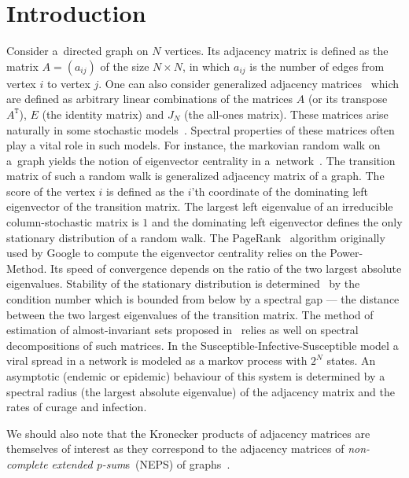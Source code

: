 \documentclass[a4paper]{jpconf}
\begin{document}
\section{Introduction}
Consider a~directed graph on \( N \) vertices.
Its adjacency matrix is defined as
    the matrix
    \( A = (a_{ij}) \)
    of the size \( N\times N \),
    in which \( a_{ij} \)
    is the number of edges
    from vertex \( i \)
    to vertex \( j \).
One can also consider generalized
    adjacency matrices~\cite{van2003graphs}
    which are defined as
    arbitrary linear combinations
    of the matrices \( A \) (or its transpose \( A^\mathtt{T} \)),
    \( E \) (the identity matrix)
    and \( J_N \) (the all-ones matrix).
These matrices arise naturally
    in some stochastic models~\cite[p.~184]{cvetkovic2010introduction}.
Spectral  properties of these matrices
    often play a vital role in such models.
For instance, the markovian random walk on a~graph
    yields the notion of eigenvector centrality
    in a~network~\cite{bonacich1972factoring}.
The transition matrix of such a random walk
    is generalized adjacency matrix of a graph.
The score of the vertex \( i \)
    is defined as the \( i \)'th coordinate
    of the dominating left eigenvector
    of the transition matrix.
The largest left eigenvalue of an irreducible column-stochastic matrix
    is \( 1 \) and the dominating left eigenvector
    defines the only stationary distribution
    of a random walk.
The PageRank~\cite{ilprints422} algorithm
    originally used by Google
    to compute the eigenvector centrality
    relies on the Power-Method.
Its speed of convergence depends on
    the ratio of the two largest absolute eigenvalues.
Stability of the stationary distribution
    is determined~\cite{meyer1994sensitivity}
    by the condition number
    which is bounded from below
    by a spectral gap --- the distance between
    the two largest eigenvalues
    of the transition matrix.
The method of estimation of almost-invariant sets
    proposed in~\cite{schwartz2006fluctuation}
    relies as well on spectral decompositions of such matrices.
In the Susceptible-Infective-Susceptible model
    a viral spread in a network
    is modeled as a markov process
    with \( 2^N \) states.
An asymptotic (endemic or epidemic) behaviour of this system
    is determined by a spectral radius (the largest absolute eigenvalue)
    of the adjacency matrix
    and the rates of curage and infection.

We should also note that the Kronecker products
    of adjacency matrices
    are themselves of interest
    as they correspond to the adjacency matrices of
    \emph{non-complete extended p-sum}s~(NEPS)
    of graphs~\cite[p.~44]{cvetkovic2010introduction}.
\end{document}
